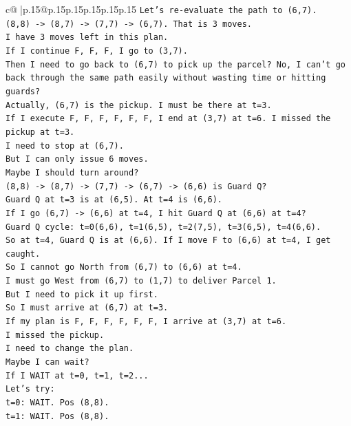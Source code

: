 \documentclass{article}
\begin{document}
{\begin{supertabular}{c@{$\;$}|p{.15\linewidth}@{}p{.15\linewidth}p{.15\linewidth}p{.15\linewidth}p{.15\linewidth}p{.15\linewidth}}
{{{\texttt{Let's re{-}evaluate the path to (6,7).} \\
\texttt{(8,8) {-}> (8,7) {-}> (7,7) {-}> (6,7). That is 3 moves.} \\
\texttt{I have 3 moves left in this plan.} \\
\texttt{If I continue F, F, F, I go to (3,7).} \\
\texttt{Then I need to go back to (6,7) to pick up the parcel? No, I can't go back through the same path easily without wasting time or hitting guards?} \\
\texttt{Actually, (6,7) is the pickup. I must be there at t=3.} \\
\texttt{If I execute F, F, F, F, F, F, I end at (3,7) at t=6. I missed the pickup at t=3.} \\
\texttt{I need to stop at (6,7).} \\
\texttt{But I can only issue 6 moves.} \\
\texttt{Maybe I should turn around?} \\
\texttt{(8,8) {-}> (8,7) {-}> (7,7) {-}> (6,7) {-}> (6,6) is Guard Q?} \\
\texttt{Guard Q at t=3 is at (6,5). At t=4 is (6,6).} \\
\texttt{If I go (6,7) {-}> (6,6) at t=4, I hit Guard Q at (6,6) at t=4?} \\
\texttt{Guard Q cycle: t=0(6,6), t=1(6,5), t=2(7,5), t=3(6,5), t=4(6,6).} \\
\texttt{So at t=4, Guard Q is at (6,6). If I move F to (6,6) at t=4, I get caught.} \\
\texttt{So I cannot go North from (6,7) to (6,6) at t=4.} \\
\texttt{I must go West from (6,7) to (1,7) to deliver Parcel 1.} \\
\texttt{But I need to pick it up first.} \\
\texttt{So I must arrive at (6,7) at t=3.} \\
\texttt{If my plan is F, F, F, F, F, F, I arrive at (3,7) at t=6.} \\
\texttt{I missed the pickup.} \\
\texttt{I need to change the plan.} \\
\texttt{Maybe I can wait?} \\
\texttt{If I WAIT at t=0, t=1, t=2...} \\
\texttt{Let's try:} \\
\texttt{t=0: WAIT. Pos (8,8).} \\
\texttt{t=1: WAIT. Pos (8,8).} \\
}}}
\end{supertabular}}
\end{document}
